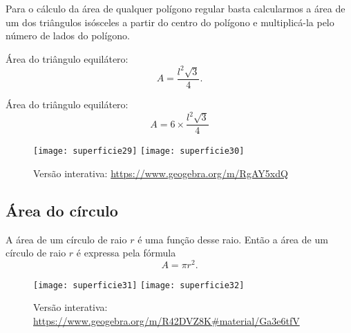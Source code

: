 Para o cálculo da área de qualquer polígono regular basta calcularmos a área de um dos triângulos isósceles a partir do centro do polígono e multiplicá-la pelo número de lados do polígono.

\begin{multicols}{2}
\centering
Área do triângulo equilátero: 
\begin{equation*}
A=\frac{l^2\sqrt{3}}{4}.
\end{equation*}

Área do triângulo equilátero: 
\begin{equation*}
A=6\times\frac{l^2\sqrt{3}}{4}
\end{equation*}
\end{multicols}

\begin{figure}[H]
\centering

\texttt{[image: superficie29]}
\hspace{1em}
\texttt{[image: superficie30]}

\caption{Versão interativa: \url{https://www.geogebra.org/m/RgAY5xdQ}}
\end{figure}

\clearpage
\subsection{Área do círculo}

A área de um círculo de raio $r$ é uma função desse raio. Então a área de um círculo de raio $r$ é expressa pela fórmula
\begin{equation*}
A=\pi r^2.
\end{equation*}

\begin{figure}[H]
\centering

\texttt{[image: superficie31]}
\hspace{1em}
\texttt{[image: superficie32]}

\caption{Versão interativa: \url{https://www.geogebra.org/m/R42DVZ8K\#material/Ga3e6tfV}}
\end{figure}
\clearpage

